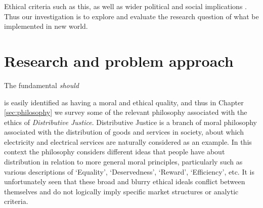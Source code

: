 Ethical criteria such as this, as well as wider political and social implications \DIFdelbegin {}\DIFdelend \DIFaddbegin {}\DIFaddend . 
Thus our investigation is to explore and evaluate the research question of what \DIFdelbegin {}\textit{} %
\DIFdelend \DIFaddbegin {}\DIFaddend be implemented in \DIFdelbegin {}\DIFdelend \DIFaddbegin {}\DIFaddend new world.


\DIFaddbegin \noindent {}


\DIFaddend \section{Research and problem approach}

The fundamental \DIFdelbegin {}\DIFdelend \DIFaddbegin {}\DIFaddend \textit{should} \DIFdelbegin {}\DIFdelend \DIFaddbegin {}

\DIFaddend is easily identified as having a moral and ethical quality, and thus in Chapter \ref{sec:philosophy} we survey some of the relevant philosophy associated with the ethics of \textit{Distributive Justice}.
Distributive Justice is a branch of moral philosophy associated with the distribution of goods and services in society, about which electricity and electrical services are naturally considered as an example.
In this context the philosophy considers different ideas that people have about distribution in relation to more general moral principles, particularly such as various descriptions of `Equality', `Deservedness', `Reward', `Efficiency', etc.
It is unfortunately seen that these broad and blurry ethical ideals conflict between themselves and do not logically imply specific market structures or analytic criteria.


